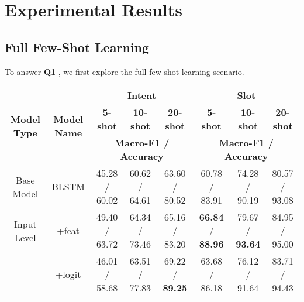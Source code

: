 \section{Experimental Results}
\label{sec:experiments}

\subsection{Full Few-Shot Learning}
To answer \textbf{Q1} , we first explore the full few-shot learning scenario.

\begin{table*}
\setlength{\tabcolsep}{0.23em}
\centering
\small{
\begin{tabular}{|c|c|c|c|c|c|c|c|}

\hline
\multirow{3}{*}{\textbf{Model Type}} & \multirow{3}{*}{\textbf{Model Name}}  & \multicolumn{3}{|c|}{\textbf{Intent}} & \multicolumn{3}{|c|}{\textbf{Slot}} \\
\cline{3-8}
&  & \multicolumn{1}{|c|}{\textbf{5-shot}} & \multicolumn{1}{|c|}{\textbf{10-shot}} & \multicolumn{1}{|c|}{\textbf{20-shot}}
& \multicolumn{1}{|c|}{\textbf{5-shot}} & \multicolumn{1}{|c|}{\textbf{10-shot}} & \multicolumn{1}{|c|}{\textbf{20-shot}}  \\
\cline{3-8}
&  & \multicolumn{3}{|c|}{\textbf{Macro-F1 / Accuracy}} & \multicolumn{3}{|c|}{\textbf{Macro-F1 / Accuracy}} \\
\hline

\rowcolor{Gray}Base Model & BLSTM & 45.28 / 60.02 & 60.62 / 64.61 & 63.60 / 80.52
& 60.78 / 83.91 & 74.28  / 90.19 & 80.57 / 93.08  \\
\hline
Input Level & +feat & 49.40 / 63.72 & 64.34 / 73.46 & 65.16 / 83.20
& \textbf{66.84} / \textbf{88.96} & 79.67 / \textbf{93.64} & 84.95 / 95.00  \\
\hline

\rowcolor{Gray}  & +logit & 46.01 / 58.68 & 63.51 / 77.83 & 69.22 / \textbf{89.25}
& 63.68 / 86.18 & 76.12 / 91.64  & 83.71 / 94.43 \\
\cline{2-8}


\end{tabular}}
\end{table*}

